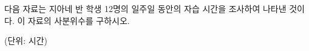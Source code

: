 다음 자료는 지아네 반 학생 12명의 일주일 동안의 자습 시간을 조사하여 나타낸 것이다. 이 자료의 사분위수를 구하시오.\par\noindent\hfill{\footnotesize (단위: 시간)}
